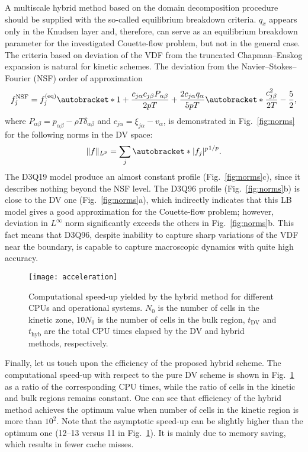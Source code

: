 \documentclass{aip-cp}
\DeclarePairedDelimiter\autobracket()       %
\newcommand{\br}[1]{\autobracket*{#1}}
\newcommand{\xiai}{\xi_{j \alpha}}
\newcommand{\cai}{c_{j \alpha}}
\newcommand{\caj}{c_{j \beta}}
\newcommand{\equil}[1]{#1^\mathrm{(eq)}}
\begin{document}
A multiscale hybrid method based on the domain decomposition procedure should be supplied with the so-called equilibrium breakdown criteria.
\(q_x\) appears only in the Knudsen layer and, therefore, can serve as an equilibrium breakdown parameter
for the investigated Couette-flow problem, but not in the general case.
The criteria based on deviation of the VDF from the truncated Chapman--Enskog expansion is natural for kinetic schemes.
The deviation from the Navier--Stokes--Fourier (NSF) order of approximation~\cite{Zhang2014}
\begin{equation}\label{eq:NSF}
    f^{\mathrm{NSF}}_j = \equil{f}_j\br{
        1 + \frac{\cai\caj P_{\alpha\beta}}{2pT} + \frac{2\cai q_\alpha}{5pT}\br{\frac{\caj^2}{2T} - \frac52} },
\end{equation}
where \(P_{\alpha\beta} = p_{\alpha\beta} - \rho T\delta_{\alpha\beta}\) and \(\cai = \xiai - v_\alpha\),
is demonstrated in Fig.~\ref{fig:norms} for the following norms in the DV space:
\begin{equation}\label{eq:norms}
    \|f\|_{L^p} = \sum_j \br{|f_j|^p}^{1/p}.
\end{equation}
The D3Q19 model produce an almost constant profile (Fig.~\ref{fig:norms}c), since it describes nothing beyond the NSF level.
The D3Q96 profile (Fig.~\ref{fig:norms}b) is close to the DV one (Fig.~\ref{fig:norms}a),
which indirectly indicates that this LB model gives a good approximation for the Couette-flow problem;
however, deviation in \(L^\infty\) norm significantly exceeds the others in Fig.~\ref{fig:norms}b.
This fact means that D3Q96, despite inability to capture sharp variations of the VDF near the boundary,
is capable to capture macroscopic dynamics with quite high accuracy.

\begin{figure}
    \centering
    \texttt{[image: acceleration]}
    \caption{
        Computational speed-up yielded by the hybrid method for different CPUs and operational systems.
        $N_0$ is the number of cells in the kinetic zone, $10N_0$ is the number of cells in the bulk region,
        $t_\mathrm{DV}$ and $t_\mathrm{hyb}$ are the total CPU times elapsed by the DV and hybrid methods, respectively.
    }\label{fig:speed-up}
\end{figure}

Finally, let us touch upon the efficiency of the proposed hybrid scheme.
The computational speed-up with respect to the pure DV scheme is shown in Fig.~\ref{fig:speed-up} as a ratio of the corresponding CPU times,
while the ratio of cells in the kinetic and bulk regions remains constant.
One can see that efficiency of the hybrid method achieves the optimum value when number of cells in the kinetic region is more than $10^2$.
Note that the asymptotic speed-up can be slightly higher than the optimum one (12--13 versus 11 in Fig.~\ref{fig:speed-up}).
It is mainly due to memory saving, which results in fewer cache misses.
\end{document}
